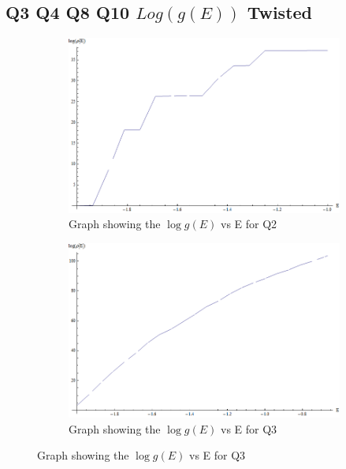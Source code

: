 \subsection{Q3 Q4 Q8 Q10 $Log(g(E))$ Twisted}
\label{subsec:QLoggInt}
\begin{figure}[H]
\centering
\begin{subfigure}[b]{0.45\textwidth}
    \includegraphics[width=\textwidth]{7-Appendices/intQ2Log(rho(E)).png}
    \caption{Graph showing the $\log{g\left(E\right)}$ vs E for Q2}
\end{subfigure}
\begin{subfigure}[b]{0.45\textwidth}
    \includegraphics[width=\textwidth]{7-Appendices/intQ3Log(rho(E)).png}
    \caption{Graph showing the $\log{g\left(E\right)}$ vs E for Q3}
\end{subfigure}


\end{figure}
